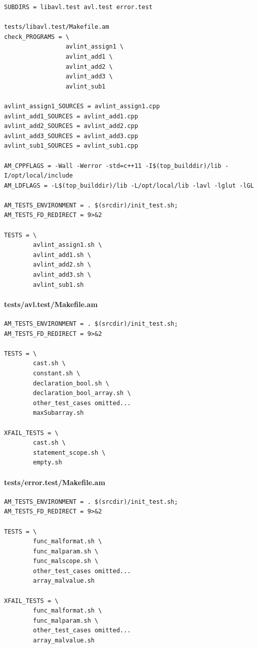 \begin{verbatim}
SUBDIRS = libavl.test avl.test error.test

tests/libavl.test/Makefile.am
check_PROGRAMS = \
                 avlint_assign1 \
                 avlint_add1 \
                 avlint_add2 \
                 avlint_add3 \
                 avlint_sub1

avlint_assign1_SOURCES = avlint_assign1.cpp
avlint_add1_SOURCES = avlint_add1.cpp
avlint_add2_SOURCES = avlint_add2.cpp
avlint_add3_SOURCES = avlint_add3.cpp
avlint_sub1_SOURCES = avlint_sub1.cpp

AM_CPPFLAGS = -Wall -Werror -std=c++11 -I$(top_builddir)/lib -I/opt/local/include
AM_LDFLAGS = -L$(top_builddir)/lib -L/opt/local/lib -lavl -lglut -lGL

AM_TESTS_ENVIRONMENT = . $(srcdir)/init_test.sh;
AM_TESTS_FD_REDIRECT = 9>&2

TESTS = \
        avlint_assign1.sh \
        avlint_add1.sh \
        avlint_add2.sh \
        avlint_add3.sh \
        avlint_sub1.sh
\end{verbatim}

\paragraph{tests/avl.test/Makefile.am}

\begin{verbatim}
AM_TESTS_ENVIRONMENT = . $(srcdir)/init_test.sh;
AM_TESTS_FD_REDIRECT = 9>&2

TESTS = \
        cast.sh \
        constant.sh \
        declaration_bool.sh \
        declaration_bool_array.sh \
        other_test_cases omitted...
        maxSubarray.sh

XFAIL_TESTS = \
        cast.sh \
        statement_scope.sh \
        empty.sh
\end{verbatim}

\paragraph{tests/error.test/Makefile.am}

\begin{verbatim}
AM_TESTS_ENVIRONMENT = . $(srcdir)/init_test.sh;
AM_TESTS_FD_REDIRECT = 9>&2

TESTS = \
        func_malformat.sh \
        func_malparam.sh \
        func_malscope.sh \
        other_test_cases omitted...
        array_malvalue.sh

XFAIL_TESTS = \
        func_malformat.sh \
        func_malparam.sh \
        other_test_cases omitted...
        array_malvalue.sh
\end{verbatim}

